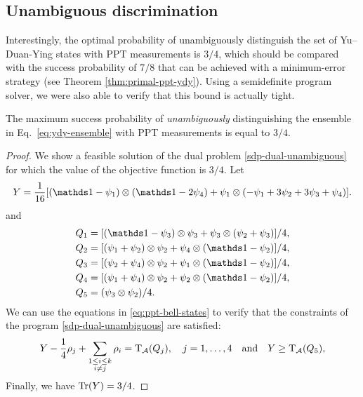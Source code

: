 \subsection{Unambiguous discrimination}

Interestingly, the optimal probability of unambiguously distinguish the set of Yu--Duan-Ying states
with PPT measurements is $3/4$, which should be compared with the success probability of $7/8$ that can be achieved with a minimum-error strategy 
(see Theorem \ref{thm:primal-ppt-ydy}). 
Using a semidefinite program solver, we were also able to verify that this bound is actually tight.

\begin{theorem}
The maximum success probability of \emph{unambiguously} 
distinguishing the ensemble in Eq.~\eqref{eq:ydy-ensemble} with PPT measurements is equal to $3/4$. 
\end{theorem}
\begin{proof}
We show a feasible solution of the dual problem \eqref{sdp-dual-unambiguous} for which the value of the objective function is $3/4$. Let
\begin{equation}
  Y = \frac{1}{16}[(\I-\psi_{1})\otimes(\I - 2\psi_{4}) + \psi_{1}\otimes(-\psi_{1}+3\psi_{2}+3\psi_{3}+\psi_{4})].
\end{equation}
and
\begin{equation}
\begin{aligned}
 Q_{1} &= [(\I - \psi_{3})\otimes\psi_{3} + \psi_{3}\otimes(\psi_{2}+\psi_{3})]/4, \\
 Q_{2} &= [(\psi_{1} + \psi_{2})\otimes\psi_{2} + \psi_{4}\otimes(\I - \psi_{2})]/4, \\
 Q_{3} &= [(\psi_{2} + \psi_{4})\otimes\psi_{2} + \psi_{1}\otimes(\I - \psi_{2})]/4, \\
 Q_{4} &= [(\psi_{1} + \psi_{4})\otimes\psi_{2} + \psi_{2}\otimes(\I - \psi_{2})]/4, \\
 Q_{5} &= (\psi_{3}\otimes\psi_{2})/4.
\end{aligned}
\end{equation}
We can use the equations in \eqref{eq:ppt-bell-states} to verify that 
the constraints of the program \eqref{sdp-dual-unambiguous} are satisfied:
\begin{equation}
Y - \frac{1}{4}\rho_{j} + \sum_{\substack{1\leq i \leq k \\ i\neq j}}\rho_{i} = \operatorname{T}_{\mathcal{A}}(Q_{j}), \quad j=1,\ldots,4 \quad\text{and}\quad Y \geq \operatorname{T}_{\mathcal{A}}(Q_{5}),
\end{equation}
Finally, we have $\operatorname{Tr}(Y) = 3/4$.
\end{proof}

